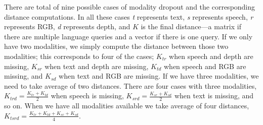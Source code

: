 \documentclass[10pt]{article} %
\begin{document}
There are total of nine possible cases of modality dropout and the corresponding distance computations. In all these cases \textit{t} represents text, \textit{s} represents speech, \textit{r} represents RGB, \textit{d} represents depth, and $K$ is the final distance---a matrix if there are multiple language queries and a vector if there is one query.
If we only have two modalities, we simply compute the distance between those two modalities; this corresponds to four of the cases; $K_{tr}$ when speech and depth are missing, $K_{sr}$ when text and depth are missing, $K_{td}$ when speech and RGB are missing, and $K_{sd}$ when text and RGB are missing. If we have three modalities, we need to take average of two distances. There are four cases with three modalities, $K_{trd} = \frac{K_{tr} + K_{td}}{2}$ when speech is missing, $K_{srd} = \frac{K_{sr} + K_{sd}}{2}$ when text is missing, 
and so on.
When we have all modalities available we take average of four distances, $K_{tsrd} = \frac{K_{tr}+ K_{td} +K_{sr} + K_{sd}}{4}$. 

\end{document}
